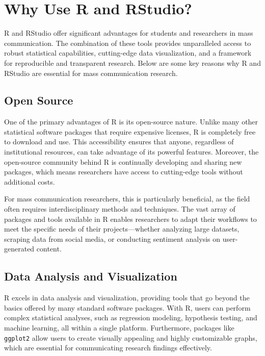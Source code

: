 \documentclass[
]{book}
\begin{document}
\section{Why Use R and RStudio?}\label{why-use-r-and-rstudio}

R and RStudio offer significant advantages for students and researchers in mass communication. The combination of these tools provides unparalleled access to robust statistical capabilities, cutting-edge data visualization, and a framework for reproducible and transparent research. Below are some key reasons why R and RStudio are essential for mass communication research.

\subsection*{Open Source}\label{open-source}

One of the primary advantages of R is its open-source nature. Unlike many other statistical software packages that require expensive licenses, R is completely free to download and use. This accessibility ensures that anyone, regardless of institutional resources, can take advantage of its powerful features. Moreover, the open-source community behind R is continually developing and sharing new packages, which means researchers have access to cutting-edge tools without additional costs.

For mass communication researchers, this is particularly beneficial, as the field often requires interdisciplinary methods and techniques. The vast array of packages and tools available in R enables researchers to adapt their workflows to meet the specific needs of their projects---whether analyzing large datasets, scraping data from social media, or conducting sentiment analysis on user-generated content.

\subsection*{Data Analysis and Visualization}\label{data-analysis-and-visualization}

R excels in data analysis and visualization, providing tools that go beyond the basics offered by many standard software packages. With R, users can perform complex statistical analyses, such as regression modeling, hypothesis testing, and machine learning, all within a single platform. Furthermore, packages like \texttt{ggplot2} allow users to create visually appealing and highly customizable graphs, which are essential for communicating research findings effectively.
\end{document}
